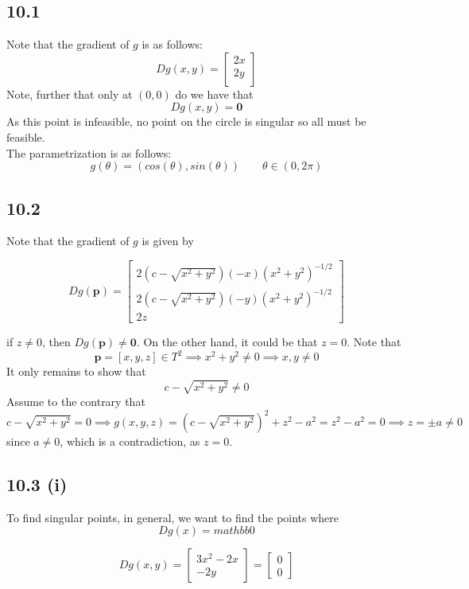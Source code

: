 \documentclass[letterpaper,12pt]{article}
\theoremstyle{definition}
\begin{document}
\subsection*{10.1}

Note that the gradient of $g$ is as follows:
\[Dg(x,y)=\begin{bmatrix} 2x\\
2y \\
\end{bmatrix}\]
Note, further that only at $(0,0)$ do we have that \[Dg(x,y) = \mathbf{0}\] As this point is infeasible, no point on the circle is singular so all must be feasible.\\
The parametrization is as follows: 
\[g(\theta)=(cos(\theta), sin (\theta)) \qquad \theta \in (0,2\pi)\]

\subsection*{10.2}

Note that the gradient of $g$ is given by 

	\[Dg(\mathbf{p}) = \begin{bmatrix} 2(c - \sqrt{x^2+y^2})(-x)(x^2+y^2)^{-1/2}\\ 2(c - \sqrt{x^2+y^2})(-y)(x^2+y^2)^{-1/2} \\ 2z \end{bmatrix} \]
        
        if $z\neq0$, then $Dg(\mathbf{p}) \neq \mathbf{0}.$ On the other hand, it could be that $z=0$. Note that 
        \[ \mathbf{p}=[x, y, z] \in T^2 \implies x^2+y^2 \neq 0 \implies x, y \neq 0 \]
 It only remains to show that \[c - \sqrt{x^2+y^2} \neq 0\]
Assume to the contrary that \[c - \sqrt{x^2+y^2} = 0 \implies g(x,y,z) = (c - \sqrt{x^2+y^2})^2 +z^2 - a^2 = z^2 -a^2 =0 \implies z = \pm a \neq 0\] since $a \neq 0$, which is a contradiction, as $z=0$.

\subsection*{10.3 (i)}
To find singular points, in general, we want to find the points where \[ Dg(x) = mathbb{0} \]

\[ Dg(x,y)= \begin{bmatrix}
3x^2 -2x \\
-2y 
\end{bmatrix} = \begin{bmatrix}
0 \\
0 
\end{bmatrix} \]
\end{document}
